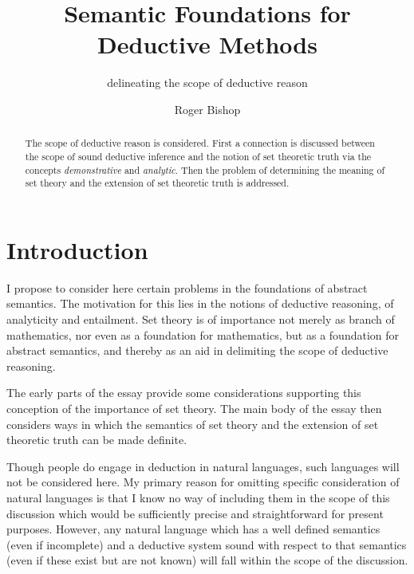 \documentclass[numreferences]{rbjk}
\begin{document}
                                                                                   
\begin{article}
\begin{opening}  
\title{Semantic Foundations for Deductive Methods}
\subtitle{delineating the scope of deductive reason}
\author{Roger Bishop }

\begin{abstract}
The scope of deductive reason is considered.
First a connection is discussed between the scope of sound deductive inference and the notion of set theoretic truth via the concepts {\it demonstrative} and {\it analytic}.
Then the problem of determining the meaning of set theory and the extension of set theoretic truth is addressed.
\end{abstract}
\end{opening}

\section{Introduction}

I propose to consider here certain problems in the foundations of abstract semantics.
The motivation for this lies in the notions of deductive reasoning, of analyticity and entailment.
Set theory is of importance not merely as branch of mathematics, nor even as a foundation for mathematics, but as a foundation for abstract semantics, and thereby as an aid in delimiting the scope of deductive reasoning.

The early parts of the essay provide some considerations supporting this conception of the importance of set theory.
The main body of the essay then considers ways in which the semantics of set theory and the extension of set theoretic truth can be made definite.

Though people do engage in deduction in natural languages, such languages will not be considered here.
My primary reason for omitting specific consideration of natural languages is that I know no way of including them in the scope of this discussion which would be sufficiently precise and straightforward for present purposes.
However, any natural language which has a well defined semantics (even if incomplete) and a deductive system sound with respect to that semantics (even if these exist but are not known) will fall within the scope of the discussion.


\end{article}
\end{document}
